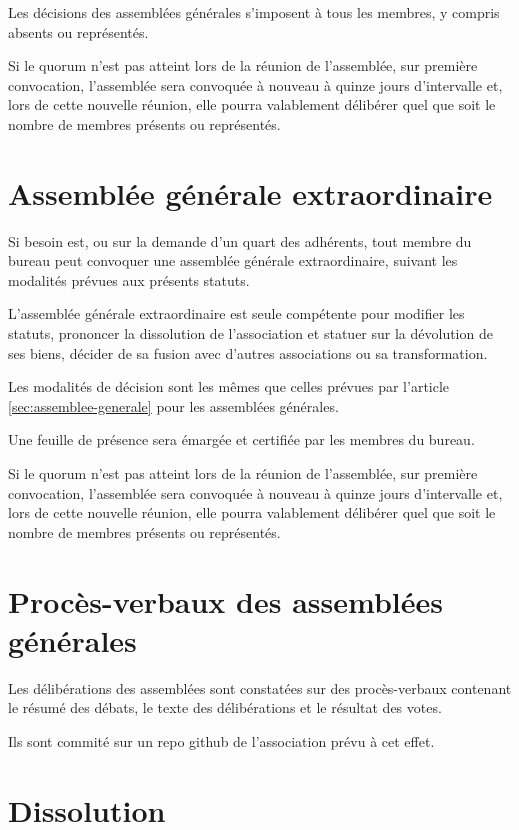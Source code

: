 \documentclass[12 pt]{article}
\begin{document}
Les décisions des assemblées générales s’imposent à tous les membres,
y compris absents ou représentés.

Si le quorum n'est pas atteint lors de la réunion de l'assemblée, sur
première convocation, l'assemblée sera convoquée à nouveau à quinze
jours d'intervalle et, lors de cette nouvelle réunion, elle pourra
valablement délibérer quel que soit le nombre de membres présents ou
représentés.


\section{Assemblée générale extraordinaire}
\label{sec:assemblee-generale-extraordinaire}

Si besoin est, ou sur la demande d’un quart des adhérents, tout membre
du bureau peut convoquer une assemblée générale extraordinaire,
suivant les modalités prévues aux présents statuts.

L'assemblée générale extraordinaire est seule compétente pour modifier
les statuts, prononcer la dissolution de l'association et statuer sur
la dévolution de ses biens, décider de sa fusion avec d'autres
associations ou sa transformation.

Les modalités de décision sont les mêmes que celles prévues par
l'article \ref{sec:assemblee-generale} pour les assemblées générales.

Une feuille de présence sera émargée et certifiée par les membres du bureau.

Si le quorum n'est pas atteint lors de la réunion de l'assemblée, sur
première convocation, l'assemblée sera convoquée à nouveau à quinze
jours d'intervalle et, lors de cette nouvelle réunion, elle pourra
valablement délibérer quel que soit le nombre de membres présents ou
représentés.

\section{Procès-verbaux des assemblées générales}
\label{sec:proces-verbaux-des-assemblees-generales}

Les délibérations des assemblées sont constatées sur des
procès-verbaux contenant le résumé des débats, le texte des
délibérations et le résultat des votes.

Ils sont commité sur un repo github de l'association prévu à cet
effet.


\section{Dissolution}
\label{sec:dissolution}
\end{document}
